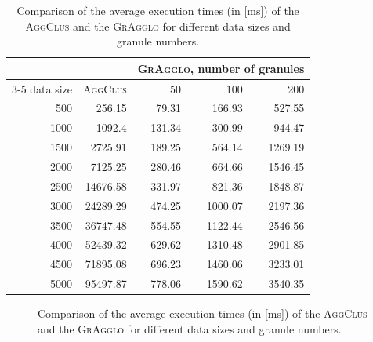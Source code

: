 \documentclass{amcs}
\newcommand{\procedura}[1]{\textsc{#1}}
\newcommand{\abbrAgglomerativeClustering}{\procedura{AggClus}}
\newcommand{\MojAlg}{\procedura{GrAgglo}}
\begin{document}
\begin{table}
 	\centering
   \caption{Comparison of the average execution times (in [ms]) of the \abbrAgglomerativeClustering{} and the \MojAlg{} for different data sizes and granule numbers.}
 	\label{id:tab:comparing-times}
 	\begin{tabular}{rrrrr}
 		\toprule
                &  & \multicolumn{3}{c}{\MojAlg, number of granules} \\
      \cmidrule(lr){3-5}
 		data size & \abbrAgglomerativeClustering & 50  & 100  & 200   \\
 		\midrule
 		500  & 256.15 & 79.31 & 166.93 & 527.55 \\
		1000 & 1092.4 & 131.34 & 300.99 & 944.47 \\
		1500 & 2725.91 & 189.25 & 564.14 & 1269.19 \\
		2000 & 7125.25 & 280.46 & 664.66 & 1546.45 \\
		2500 & 14676.58 & 331.97 & 821.36 & 1848.87 \\
		3000 & 24289.29 & 474.25 & 1000.07 & 2197.36 \\
		3500 & 36747.48 & 554.55 & 1122.44 & 2546.56 \\
		4000 & 52439.32 & 629.62 & 1310.48 & 2901.85 \\
		4500 & 71895.08 & 696.23 & 1460.06 & 3233.01 \\
		5000 & 95497.87 & 778.06 & 1590.62 & 3540.35 \\
 		\bottomrule
 	\end{tabular}
\end{table}
\begin{figure}
 \centering
   \caption{Comparison of the average execution times (in [ms]) of the \abbrAgglomerativeClustering{} and the \MojAlg{} for different data sizes and granule numbers.}
 	\label{id:fig:comparing-times}
\end{figure}
\end{document}
